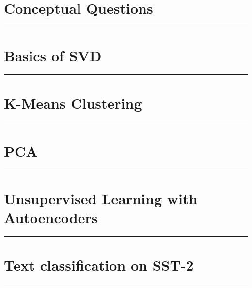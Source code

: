 \documentclass{article}
\begin{document}


\section*{Conceptual Questions}
\noindent\rule{\textwidth}{1pt}\vspace{0.75mm}


\section*{Basics of SVD}
\noindent\rule{\textwidth}{1pt}\vspace{0.75mm}


\section*{K-Means Clustering}
\noindent\rule{\textwidth}{1pt}\vspace{0.75mm}


\section*{PCA}
\noindent\rule{\textwidth}{1pt}\vspace{0.75mm}


\section*{Unsupervised Learning with Autoencoders}
\noindent\rule{\textwidth}{1pt}\vspace{0.75mm}


\section*{Text classification on SST-2}
\noindent\rule{\textwidth}{1pt}\vspace{0.75mm}

\end{document}
